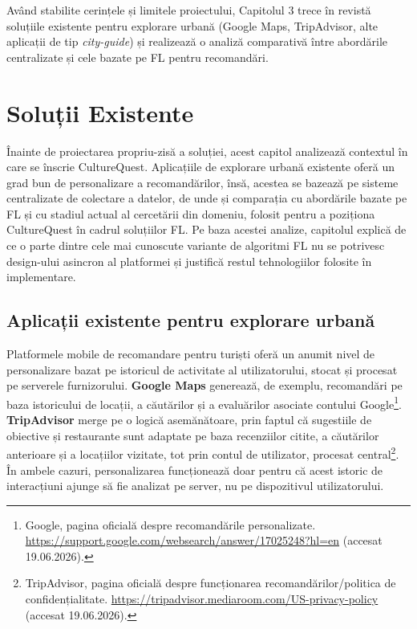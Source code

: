 \documentclass[12pt,a4paper]{report}
\begin{document}
Având stabilite cerințele și limitele proiectului, Capitolul 3 trece în revistă soluțiile existente pentru explorare urbană (Google Maps, TripAdvisor, alte aplicații de tip \textit{city-guide}) și realizează o analiză comparativă între abordările centralizate și cele bazate pe FL pentru recomandări.

\chapter{Soluții Existente}

Înainte de proiectarea propriu-zisă a soluției, acest capitol analizează contextul în care se înscrie CultureQuest. Aplicațiile de explorare urbană existente oferă un grad bun de personalizare a recomandărilor, însă, acestea se bazează pe sisteme centralizate de colectare a datelor, de unde și comparația cu abordările bazate pe FL și cu stadiul actual al cercetării din domeniu, folosit pentru a poziționa CultureQuest în cadrul soluțiilor FL. Pe baza acestei analize, capitolul explică de ce o parte dintre cele mai cunoscute variante de algoritmi FL nu se potrivesc design-ului asincron al platformei și justifică restul tehnologiilor folosite în implementare.

\section{Aplicații existente pentru explorare urbană}

Platformele mobile de recomandare pentru turiști \cite{gavalas2014mobile} oferă un anumit nivel de personalizare bazat pe istoricul de activitate al utilizatorului, stocat și procesat pe serverele furnizorului. \textbf{Google Maps} generează, de exemplu, recomandări pe baza istoricului de locații, a căutărilor și a evaluărilor asociate contului Google\footnote{Google, pagina oficială despre recomandările personalizate. \url{https://support.google.com/websearch/answer/17025248?hl=en} (accesat 19.06.2026).}. \textbf{TripAdvisor} merge pe o logică asemănătoare, prin faptul că sugestiile de obiective și restaurante sunt adaptate pe baza recenziilor citite, a căutărilor anterioare și a locațiilor vizitate, tot prin contul de utilizator, procesat central\footnote{TripAdvisor, pagina oficială despre funcționarea recomandărilor/politica de confidențialitate. \url{https://tripadvisor.mediaroom.com/US-privacy-policy} (accesat 19.06.2026).}. În ambele cazuri, personalizarea funcționează doar pentru că acest istoric de interacțiuni ajunge să fie analizat pe server, nu pe dispozitivul utilizatorului.
\end{document}
